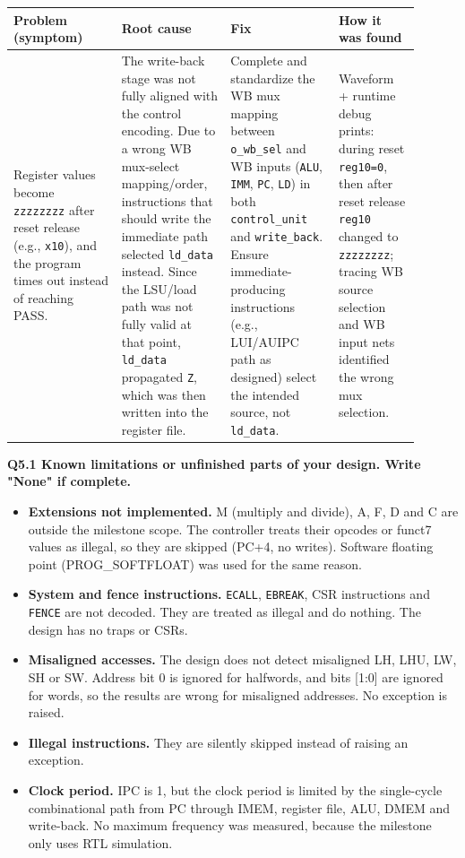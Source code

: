 \documentclass[10pt,a4paper]{article}
\newcommand{\code}[1]{\texttt{#1}}
\begin{document}
\begin{center}
\begin{tabular}{@{}p{0.24\linewidth}p{0.24\linewidth}p{0.24\linewidth}p{0.18\linewidth}@{}} \toprule \textbf{Problem (symptom)} & \textbf{Root cause} & \textbf{Fix} & \textbf{How it was found} \\ \midrule Register values become \texttt{zzzzzzzz} after reset release (e.g., \texttt{x10}), and the program times out instead of reaching PASS. & The write-back stage was not fully aligned with the control encoding. Due to a wrong WB mux-select mapping/order, instructions that should write the immediate path selected \texttt{ld\_data} instead. Since the LSU/load path was not fully valid at that point, \texttt{ld\_data} propagated \texttt{Z}, which was then written into the register file. & Complete and standardize the WB mux mapping between \texttt{o\_wb\_sel} and WB inputs (\texttt{ALU}, \texttt{IMM}, \texttt{PC}, \texttt{LD}) in both \texttt{control\_unit} and \texttt{write\_back}. Ensure immediate-producing instructions (e.g., LUI/AUIPC path as designed) select the intended source, not \texttt{ld\_data}. & Waveform + runtime debug prints: during reset \texttt{reg10=0}, then after reset release \texttt{reg10} changed to \texttt{zzzzzzzz}; tracing WB source selection and WB input nets identified the wrong mux selection. \\ \bottomrule \end{tabular}

\end{center}
\textbf{Q5.1 Known limitations or unfinished parts of your design. Write
"None" if complete.}

\begin{itemize}
  \item \textbf{Extensions not implemented.} M (multiply and divide), A, F, D
        and C are outside the milestone scope. The controller treats their
        opcodes or funct7 values as illegal, so they are skipped (PC+4, no
        writes). Software floating point (PROG\_SOFTFLOAT) was used for the
        same reason.
  \item \textbf{System and fence instructions.} \code{ECALL}, \code{EBREAK},
        CSR instructions and \code{FENCE} are not decoded. They are treated
        as illegal and do nothing. The design has no traps or CSRs.
  \item \textbf{Misaligned accesses.} The design does not detect misaligned
        LH, LHU, LW, SH or SW. Address bit 0 is ignored for halfwords, and
        bits [1:0] are ignored for words, so the results are wrong for
        misaligned addresses. No exception is raised.
  \item \textbf{Illegal instructions.} They are silently skipped instead of
        raising an exception.
  \item \textbf{Clock period.} IPC is 1, but the clock period is limited by
        the single-cycle combinational path from PC through IMEM, register
        file, ALU, DMEM and write-back. No maximum frequency was measured,
        because the milestone only uses RTL simulation.
\end{itemize}
\end{document}
